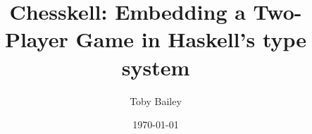 \documentclass[12pt, a4paper, bibliography=totocnumbered]{scrreprt}
\title{Chesskell: Embedding a Two-Player Game in Haskell's type system}
\author{Toby Bailey}
\date{\today}
\begin{document}
\begin{titlepage}
    \maketitle
\end{titlepage}



{
    \newpage  %
    \renewcommand{\normalfont}{\usekomafont{sectioning}}
}














\end{document}
